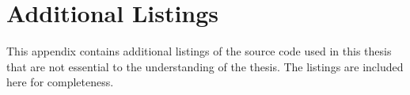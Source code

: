 \chapter{Additional Listings}
\label{app:Listings}
  This appendix contains additional listings of the source code used in this
  thesis that are not essential to the understanding of the thesis.
  The listings are included here for completeness.
  

